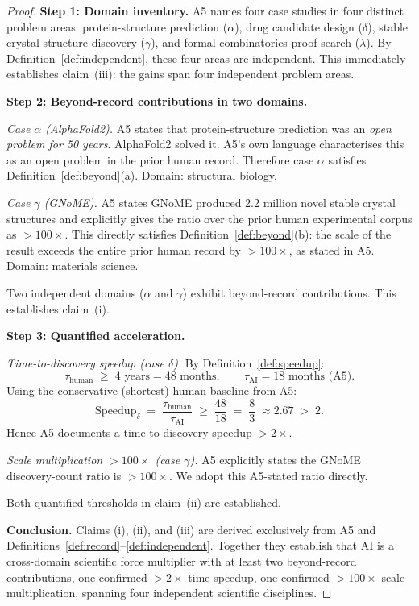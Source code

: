 \documentclass[12pt]{article}
\begin{document}
\begin{proof}

\textbf{Step 1: Domain inventory.}
A5 names four case studies in four distinct problem areas:
protein-structure prediction ($\alpha$),
drug candidate design ($\delta$),
stable crystal-structure discovery ($\gamma$), and
formal combinatorics proof search ($\lambda$).
By Definition~\ref{def:independent}, these four areas are independent.
This immediately establishes claim~(iii): the gains span four independent
problem areas.

\medskip
\noindent\textbf{Step 2: Beyond-record contributions in two domains.}

\emph{Case $\alpha$ (AlphaFold2).}
A5 states that protein-structure prediction was an \emph{open problem for
50 years}.  AlphaFold2 solved it.  A5's own language characterises this as
an open problem in the prior human record.  Therefore case $\alpha$ satisfies
Definition~\ref{def:beyond}(a).  Domain: structural biology.

\emph{Case $\gamma$ (GNoME).}
A5 states GNoME produced 2.2 million novel stable crystal structures and
explicitly gives the ratio over the prior human experimental corpus as
$>100\times$.  This directly satisfies Definition~\ref{def:beyond}(b):
the scale of the result exceeds the entire prior human record by
$>100\times$, as stated in A5.  Domain: materials science.

Two independent domains ($\alpha$ and $\gamma$) exhibit beyond-record
contributions.  This establishes claim~(i).

\medskip
\noindent\textbf{Step 3: Quantified acceleration.}

\emph{Time-to-discovery speedup (case $\delta$).}
By Definition~\ref{def:speedup}:
\[
  \tau_{\mathrm{human}} \;\geq\; 4 \text{ years} = 48\text{ months},
  \qquad
  \tau_{\mathrm{AI}} = 18\text{ months (A5)}.
\]
Using the conservative (shortest) human baseline from A5:
\[
  \text{Speedup}_\delta
  \;=\; \frac{\tau_{\mathrm{human}}}{\tau_{\mathrm{AI}}}
  \;\geq\; \frac{48}{18}
  \;=\; \frac{8}{3}
  \;\approx 2.67
  \;>\; 2.
\]
Hence A5 documents a time-to-discovery speedup $>2\times$.

\emph{Scale multiplication $>100\times$ (case $\gamma$).}
A5 explicitly states the GNoME discovery-count ratio is $>100\times$.
We adopt this A5-stated ratio directly.

Both quantified thresholds in claim~(ii) are established.

\medskip
\noindent\textbf{Conclusion.}
Claims (i), (ii), and (iii) are derived exclusively from A5 and
Definitions~\ref{def:record}--\ref{def:independent}.  Together they
establish that AI is a cross-domain scientific force multiplier with at
least two beyond-record contributions, one confirmed $>2\times$
time speedup, one confirmed $>100\times$ scale multiplication, spanning
four independent scientific disciplines.
\end{proof}
\end{document}
